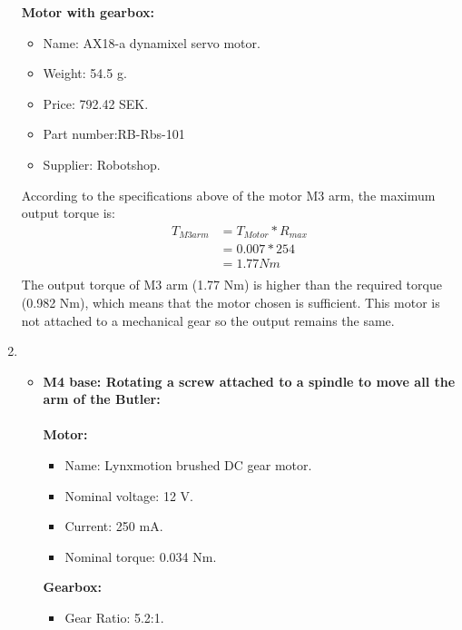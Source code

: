 \begin{enumerate}
    \textbf{Motor with gearbox:}
    \begin{itemize}
        \item Name: AX18-a dynamixel servo motor.
        \item Weight: 54.5 g.
        \item Price: 792.42 SEK.
        \item Part number:RB-Rbs-101
        \item Supplier: Robotshop. 
    \end{itemize}
    
    According to the specifications above of the motor M3 arm, the maximum output torque is:\\
    \begin{equation} \label{eq: T_M3arm }
    \begin{split}
    T_{M3arm} & = T_{Motor} * R_{max}\\
    & =  0.007 * 254\\
    & = 1.77 Nm\\
    \end{split}
    \end{equation}
    The output torque of M3 arm (1.77 Nm) is higher than the required torque (0.982 Nm), which means that the motor chosen is sufficient. This motor is not attached to a mechanical gear so the output remains the same.\\
    
    


    \item \begin{itemize}
        \item  \textbf {M4 base: Rotating a screw attached to a spindle to move all the arm of the Butler:}\\\\
   \textbf{Motor:}
    \begin{itemize}
        \item Name:  Lynxmotion brushed DC gear motor\cite{M4}.
        \item Nominal voltage: 12 V.
        \item Current: 250 mA.
        \item Nominal torque: 0.034 Nm.\\
    \end{itemize}
    
    \textbf{Gearbox:}
    \begin{itemize}
        \item Gear Ratio: 5.2:1.\\
    \end{itemize}
    

\end{itemize}
\end{enumerate}
